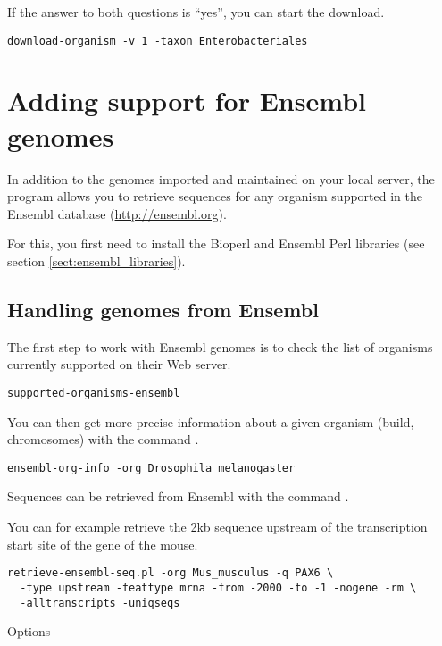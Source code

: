 If the answer to both questions is ``yes'', you can start the
download.

\begin{lstlisting}
download-organism -v 1 -taxon Enterobacteriales 
\end{lstlisting}


\section{Adding support for Ensembl genomes}

In addition to the genomes imported and maintained on your local \RSAT
server, the program  allows you to
retrieve sequences for any organism supported in the Ensembl database
(\url{http://ensembl.org}).

For this, you first need to install the Bioperl and Ensembl Perl
libraries (see section \ref{sect:ensembl_libraries}).

\subsection{Handling genomes from Ensembl}

The first step to work with Ensembl genomes is to check the list of
organisms currently supported on their Web server.

\begin{lstlisting}
supported-organisms-ensembl
\end{lstlisting}

You can then get more precise information about a given organism
(build, chromosomes) with the command .

\begin{lstlisting}
ensembl-org-info -org Drosophila_melanogaster
\end{lstlisting}

Sequences can be retrieved from Ensembl with the command
. 

You can for example retrieve the 2kb sequence upstream of the
transcription start site of the gene  of the mouse. 

\begin{lstlisting}
retrieve-ensembl-seq.pl -org Mus_musculus -q PAX6 \
  -type upstream -feattype mrna -from -2000 -to -1 -nogene -rm \
  -alltranscripts -uniqseqs
\end{lstlisting}

Options

